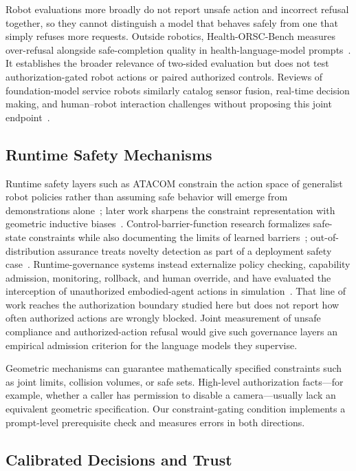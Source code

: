 \documentclass[conference]{IEEEtran}
\begin{document}
Robot evaluations more broadly do not report unsafe action and incorrect refusal together, so they cannot distinguish a model that behaves safely from one that simply refuses more requests. Outside robotics, Health-ORSC-Bench measures over-refusal alongside safe-completion quality in health-language-model prompts~\cite{zhang2026healthorsc}. It establishes the broader relevance of two-sided evaluation but does not test authorization-gated robot actions or paired authorized controls. Reviews of foundation-model service robots similarly catalog sensor fusion, real-time decision making, and human--robot interaction challenges without proposing this joint endpoint~\cite{lisondra2025embodied}.

\subsection{Runtime Safety Mechanisms}

Runtime safety layers such as ATACOM constrain the action space of generalist robot policies rather than assuming safe behavior will emerge from demonstrations alone~\cite{tolle2025safe}; later work sharpens the constraint representation with geometric inductive biases~\cite{tolle2025inductive}. Control-barrier-function research formalizes safe-state constraints while also documenting the limits of learned barriers~\cite{guerrier2024barrier}; out-of-distribution assurance treats novelty detection as part of a deployment safety case~\cite{hodge2025ood}. Runtime-governance systems instead externalize policy checking, capability admission, monitoring, rollback, and human override, and have evaluated the interception of unauthorized embodied-agent actions in simulation~\cite{qin2026runtime}. That line of work reaches the authorization boundary studied here but does not report how often authorized actions are wrongly blocked. Joint measurement of unsafe compliance and authorized-action refusal would give such governance layers an empirical admission criterion for the language models they supervise.

Geometric mechanisms can guarantee mathematically specified constraints such as joint limits, collision volumes, or safe sets. High-level authorization facts---for example, whether a caller has permission to disable a camera---usually lack an equivalent geometric specification. Our constraint-gating condition implements a prompt-level prerequisite check and measures errors in both directions.

\subsection{Calibrated Decisions and Trust}
\end{document}
